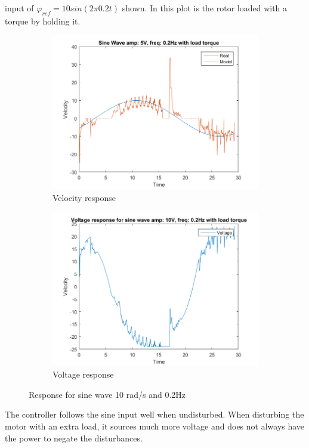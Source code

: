 \documentclass[12pt,a4paper]{article}
\begin{document}
input of $\varphi_{ref}=10sin(2\pi 0.2t)$ shown. In this plot is the
rotor loaded with a torque by holding it.
\begin{figure}[H]
  \centering
  \begin{subfigure}[b]{0.45\linewidth}
    \includegraphics[width=\linewidth]{T2_a10_f02_load.png}
    \caption{Velocity response }
    \label{fig:T2_a10_f02_load:a}
  \end{subfigure}
  \begin{subfigure}[b]{0.45\linewidth}
    \includegraphics[width=\linewidth]{T2_V_a10_f02_load.png}
    \caption{Voltage response }
    \label{fig:T2_a10_f02_load:b}
  \end{subfigure}
  \caption{Response for sine wave 10 rad/s and 0.2Hz}
  \label{fig:T2_a10_f02_load}
\end{figure}
The controller follows the sine input well when undisturbed. When disturbing the
motor with an extra load, it sources much more voltage and does not always have
the power to negate the disturbances.
\end{document}

